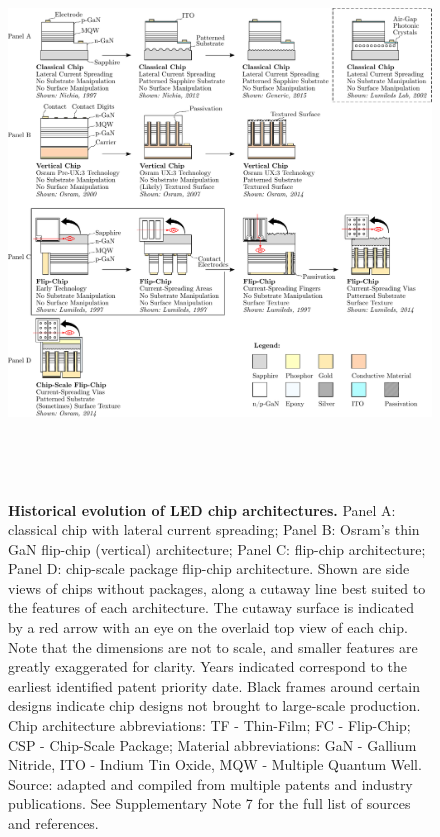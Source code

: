 \documentclass[parskip=full]{article}
\begin{document}
\clearpage
\begin{figure}[h!]
\centering
\includegraphics[height=15cm]{figures/chip_architecture_overview.pdf}
\caption{\textbf{Historical evolution of LED chip architectures.} Panel A: classical chip with lateral current spreading; Panel B: Osram’s thin GaN flip-chip (vertical) architecture; Panel C: flip-chip architecture; Panel D: chip-scale package flip-chip architecture. Shown are side views of chips without packages, along a cutaway line best suited to the features of each architecture. The cutaway surface is indicated by a red arrow with an eye on the overlaid top view of each chip. Note that the dimensions are not to scale, and smaller features are greatly exaggerated for clarity. Years indicated correspond to the earliest identified patent priority date. Black frames around certain designs indicate chip designs not brought to large-scale production. Chip architecture abbreviations: TF - Thin-Film; FC - Flip-Chip; CSP - Chip-Scale Package; Material abbreviations: GaN - Gallium Nitride, ITO - Indium Tin Oxide, MQW - Multiple Quantum Well. Source: adapted and compiled from multiple patents and industry publications. See Supplementary Note 7 for the full list of sources and references.}
\label{fgr:chip_architecture_overview}
\end{figure}
\end{document}
